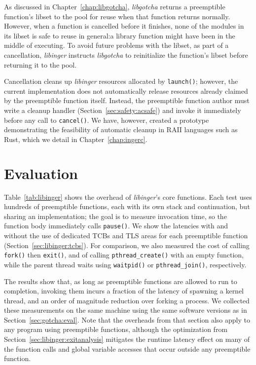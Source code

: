 As discussed in Chapter~\ref{chap:libgotcha}, \textit{libgotcha} returns a
preemptible function's libset to the pool for reuse when that function returns
normally.  However, when a function is cancelled before it finishes, none of the
modules in its libset is safe to reuse in general:\@ a library function might have
been in the middle of executing.  To avoid future problems with the libset, as part
of a cancellation, \textit{libinger} instructs \textit{libgotcha} to reinitialize the
function's libset before returning it to the pool.

Cancellation cleans up \textit{libinger} resources allocated by \texttt{launch()};
however, the current implementation does not automatically release resources already
claimed by the preemptible function itself.  Instead, the preemptible function author
must write a cleanup handler (Section~\ref{sec:safety:acsafe}) and invoke it
immediately before any call to \texttt{cancel()}.  We have, however, created a
prototype
demonstrating the feasibility of automatic cleanup in RAII languages such as Rust,
which we detail in Chapter~\ref{chap:ingerc}.


\section{Evaluation}
\label{sec:libinger:ueval}

Table~\ref{tab:libinger} shows the overhead of \textit{libinger}'s core functions.
Each test uses hundreds of preemptible functions, each with its own stack and
continuation, but sharing an implementation; the goal is to measure invocation time,
so the function body immediately calls \texttt{pause()}.  We show the latencies with
and without the use of dedicated TCBs and TLS areas for each preemptible function
(Section~\ref{sec:libinger:tcbs}).
For comparison, we also measured the cost of calling \texttt{fork()} then
\texttt{exit()}, and of calling \texttt{pthread\_create()} with an empty function,
while the parent
thread waits using \texttt{waitpid()} or \texttt{pthread\_join()}, respectively.

The results show that, as long as preemptible functions are allowed to run
to completion, invoking them incurs a fraction of the latency of spawning a kernel
thread, and an order of magnitude reduction over forking a process.  We collected
these measurements on the same machine using the same software versions as in
Section~\ref{sec:gotcha:eval}.  Note that the overheads from that section also apply
to any program using preemptible functions, although the optimization from
Section~\ref{sec:libinger:exitanalysis} mitigates the runtime latency effect on many
of the function calls and global variable accesses that occur outside any preemptible
function.

